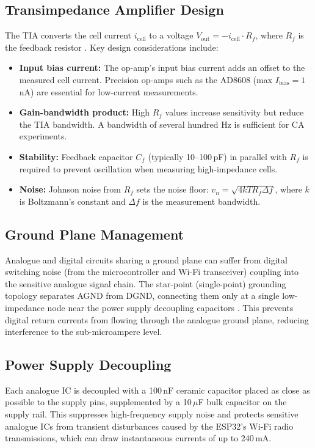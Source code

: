 \subsection{Transimpedance Amplifier Design}
The TIA converts the cell current $i_\mathrm{cell}$ to a voltage $V_\mathrm{out} = -i_\mathrm{cell} \cdot R_f$, where $R_f$ is the feedback resistor \cite{Horowitz2015}. Key design considerations include:
\begin{itemize}
    \item \textbf{Input bias current:} The op-amp's input bias current adds an offset to the measured cell current. Precision op-amps such as the AD8608 (max $I_\text{bias} = 1$\,nA) are essential for low-current measurements.
    \item \textbf{Gain-bandwidth product:} High $R_f$ values increase sensitivity but reduce the TIA bandwidth. A bandwidth of several hundred Hz is sufficient for CA experiments.
    \item \textbf{Stability:} Feedback capacitor $C_f$ (typically 10--100\,pF) in parallel with $R_f$ is required to prevent oscillation when measuring high-impedance cells.
    \item \textbf{Noise:} Johnson noise from $R_f$ sets the noise floor: $v_n = \sqrt{4kTR_f \Delta f}$, where $k$ is Boltzmann's constant and $\Delta f$ is the measurement bandwidth.
\end{itemize}

\subsection{Ground Plane Management}
Analogue and digital circuits sharing a ground plane can suffer from digital switching noise (from the microcontroller and Wi-Fi transceiver) coupling into the sensitive analogue signal chain. The star-point (single-point) grounding topology separates AGND from DGND, connecting them only at a single low-impedance node near the power supply decoupling capacitors \cite{Horowitz2015}. This prevents digital return currents from flowing through the analogue ground plane, reducing interference to the sub-microampere level.

\subsection{Power Supply Decoupling}
Each analogue IC is decoupled with a 100\,nF ceramic capacitor placed as close as possible to the supply pins, supplemented by a 10\,$\mu$F bulk capacitor on the supply rail. This suppresses high-frequency supply noise and protects sensitive analogue ICs from transient disturbances caused by the ESP32's Wi-Fi radio transmissions, which can draw instantaneous currents of up to 240\,mA.

